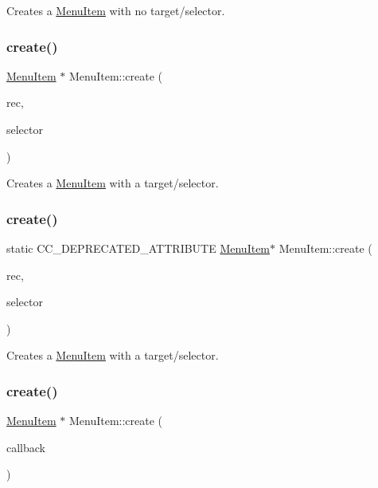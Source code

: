 Creates a \hyperlink{classMenuItem}{Menu\+Item} with no target/selector. \mbox{\label{classMenuItem_a3d78c2702e72a51501f2d4e14d15f49e}} 
\subsubsection{\texorpdfstring{create()}{create()}\hspace{0.1cm}{\footnotesize\ttfamily [3/6]}}
{\footnotesize\ttfamily \hyperlink{classMenuItem}{Menu\+Item} $\ast$ Menu\+Item\+::create (\begin{DoxyParamCaption}\item[{\hyperlink{classRef}{Ref} $\ast$}]{rec,  }\item[{S\+E\+L\+\_\+\+Menu\+Handler}]{selector }\end{DoxyParamCaption})\hspace{0.3cm}{\ttfamily [static]}}

Creates a \hyperlink{classMenuItem}{Menu\+Item} with a target/selector. \mbox{\label{classMenuItem_acad3900be8eebce65a8c737184d22d88}} 
\subsubsection{\texorpdfstring{create()}{create()}\hspace{0.1cm}{\footnotesize\ttfamily [4/6]}}
{\footnotesize\ttfamily static C\+C\+\_\+\+D\+E\+P\+R\+E\+C\+A\+T\+E\+D\+\_\+\+A\+T\+T\+R\+I\+B\+U\+TE \hyperlink{classMenuItem}{Menu\+Item}$\ast$ Menu\+Item\+::create (\begin{DoxyParamCaption}\item[{\hyperlink{classRef}{Ref} $\ast$}]{rec,  }\item[{S\+E\+L\+\_\+\+Menu\+Handler}]{selector }\end{DoxyParamCaption})\hspace{0.3cm}{\ttfamily [static]}}

Creates a \hyperlink{classMenuItem}{Menu\+Item} with a target/selector. \mbox{\label{classMenuItem_a866e2fb9b3b84c9f0b89e3d328fd9c41}} 
\subsubsection{\texorpdfstring{create()}{create()}\hspace{0.1cm}{\footnotesize\ttfamily [5/6]}}
{\footnotesize\ttfamily \hyperlink{classMenuItem}{Menu\+Item} $\ast$ Menu\+Item\+::create (\begin{DoxyParamCaption}\item[{const cc\+Menu\+Callback \&}]{callback }\end{DoxyParamCaption})\hspace{0.3cm}{\ttfamily [static]}}

